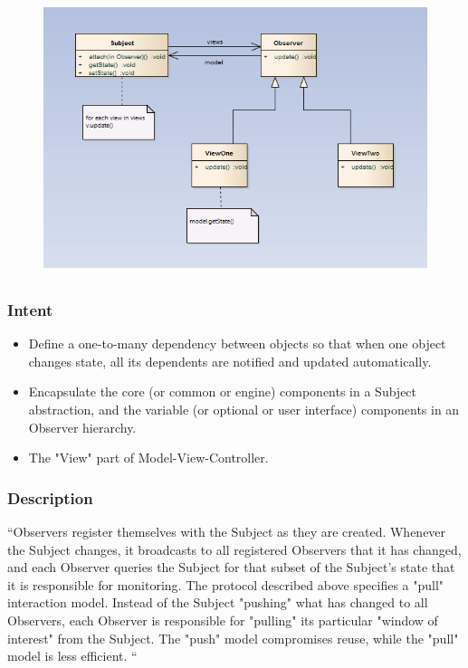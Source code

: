 \begin{figure}[!hbp]
\includegraphics[width=\textwidth, height=8cm]{img/pics/observer.PNG}
\caption{ \protect \cite{Shvets}}
\label{fig:ref_observer}
\end{figure}
\subsubsection{Intent}
\begin{itemize} 
\item Define a one-to-many dependency between objects so that when one object changes state, all its dependents are notified and updated automatically.
\item Encapsulate the core (or common or engine) components in a Subject abstraction, and the variable (or optional or user interface) components in an Observer hierarchy.
\item The "View" part of Model-View-Controller.
\end{itemize} 
\citep{Shvets}
\subsubsection{Description}
“Observers register themselves with the Subject as they are created. Whenever the Subject changes, it broadcasts to all registered Observers that it has changed, and each Observer queries the Subject for that subset of the Subject's state that it is responsible for monitoring. 
The protocol described above specifies a "pull" interaction model. Instead of the Subject "pushing" what has changed to all Observers, each Observer is responsible for "pulling"
\vspace{8cm} \vfill its particular "window of interest" from the Subject. The "push" model compromises reuse, while the "pull" model is less efficient. “\citep{Shvets}

